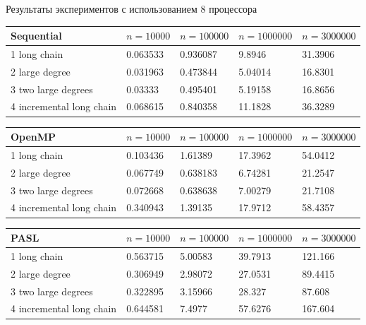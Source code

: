 \documentclass[hyperref=unicode,graphics=pdflatex,13pt]{beamer}
\begin{document}
\begin{frame}[shrink]{Результаты экспериментов с использованием 8 процессора}

\begin{table}[!ht]
\centering
\begin{tabular}{|l|l|l|l|l|}\hline
Sequential	& $n=10000$ & $n=100000$ & $n=1000000$ & $n=3000000$ \\\hline
1 long chain & 0.063533	& 0.936087 & 9.8946 & 31.3906 \\\hline
2 large degree & 0.031963 & 0.473844 & 5.04014 & 16.8301 \\\hline
3 two large degrees & 0.03333 & 0.495401 & 5.19158 & 16.8656 \\\hline
4 incremental long chain & 0.068615 & 0.840358 & 11.1828 & 36.3289 \\\hline
\end{tabular}
\end{table}

\begin{table}[!ht]
\centering
\begin{tabular}{|l|l|l|l|l|}\hline
OpenMP	& $n=10000$ & $n=100000$ & $n=1000000$ & $n=3000000$ \\\hline
1 long chain & 0.103436 & 1.61389 & 17.3962 & 54.0412 \\\hline
2 large degree & 0.067749 & 0.638183 & 6.74281 & 21.2547 \\\hline
3 two large degrees & 0.072668 & 0.638638 & 7.00279 & 21.7108 \\\hline
4 incremental long chain & 0.340943 & 1.39135 &	17.9712 & 58.4357 \\\hline
\end{tabular}
\end{table}

\begin{table}[!ht]
\centering
\begin{tabular}{|l|l|l|l|l|}\hline
PASL	& $n=10000$ & $n=100000$ & $n=1000000$ & $n=3000000$ \\\hline
1 long chain & 0.563715	& 5.00583 & 39.7913 & 121.166 \\\hline
2 large degree & 0.306949 & 2.98072 & 27.0531 & 89.4415 \\\hline
3 two large degrees & 0.322895 & 3.15966 & 28.327 & 87.608 \\\hline
4 incremental long chain & 0.644581 & 7.4977 & 57.6276 & 167.604 \\\hline
\end{tabular}
\end{table}
\end{frame}
\end{document}
